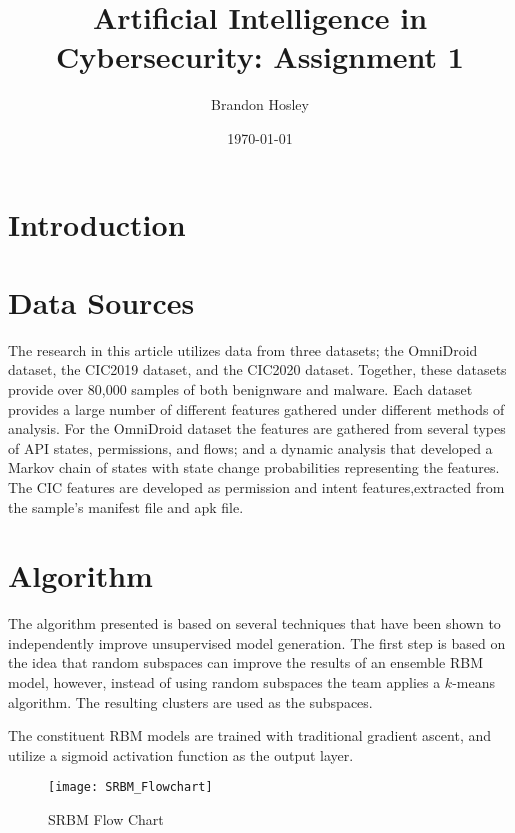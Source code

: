 \documentclass[]{article}
\title{Artificial Intelligence in Cybersecurity: Assignment 1}
\author{Brandon Hosley}
\date{\today}
\begin{document}
	\maketitle
	
\section{Introduction}

\section{Data Sources}

The research in this article utilizes data from three datasets; 
the OmniDroid \cite{Martin2019} dataset,  
the CIC2019 \cite{Taheri2019} dataset, and
the CIC2020 \cite{Rahali2020} dataset.
Together, these datasets provide over 80,000 samples of both benignware and malware.
Each dataset provides a large number of different features gathered under different methods of analysis.
For the OmniDroid dataset the features are gathered from several types of API states, permissions, and flows;
and a dynamic analysis that developed a Markov chain of states with state change probabilities representing the features.
The CIC features are developed as permission and intent features,extracted from the sample's manifest file and apk file.

\section{Algorithm}

The algorithm presented is based on several techniques that have been shown to independently improve unsupervised model generation.
The first step is based on the idea that random subspaces can improve the results of an ensemble RBM model, however, instead of using random subspaces the team applies a $k$-means algorithm.
The resulting clusters are used as the subspaces.


The constituent RBM models are trained with traditional gradient ascent, and utilize a sigmoid activation function as the output layer.

\begin{figure}[h]
	\centering
	\texttt{[image: SRBM\_Flowchart]}
	\caption{SRBM Flow Chart \cite{Liu2021}}
\end{figure}
\end{document}
